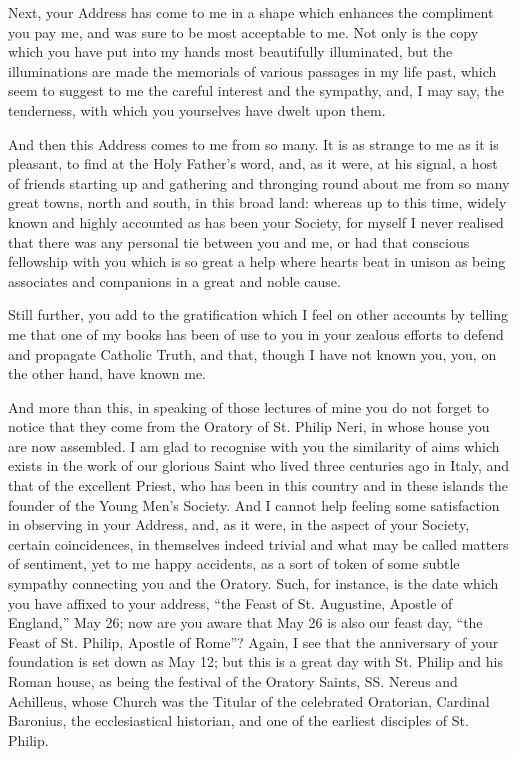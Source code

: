 Next, your Address has come to me in a shape which enhances the
compliment you pay me, and was sure to be most acceptable to me. Not
only is the copy which you have put into my hands most beautifully
illuminated, but the illuminations are made the memorials of various
passages in my life past, which seem to suggest to me the careful
interest and the sympathy, and, I may say, the tenderness, with which
you yourselves have dwelt upon them.

And then this Address comes to me from so many. It is as strange to
me as it is pleasant, to find at the Holy Father's word, and, as it
were, at his signal, a host of friends starting up and gathering and
thronging round about me from so many great towns, north and south, in
this broad land: whereas up to this time, widely known and
highly accounted as has been your Society, for myself I never realised
that there was any personal tie between you and me, or had that
conscious fellowship with you which is so great a help where hearts
beat in unison as being associates and companions in a great and noble
cause.

Still further, you add to the gratification which I feel on other
accounts by telling me that one of my books has been of use to you in
your zealous efforts to defend and propagate Catholic Truth, and that,
though I have not known you, you, on the other hand, have known me.

And more than this, in speaking of those lectures of mine you do
not forget to notice that they come from the Oratory of St. Philip
Neri, in whose house you are now assembled. I am glad to recognise
with you the similarity of aims which exists in the work of our
glorious Saint who lived three centuries ago in Italy, and that of the
excellent Priest, who has been in this country and in these islands
the founder of the Young Men's Society. And I cannot help feeling some
satisfaction in observing in your Address, and, as it were, in the
aspect of your Society, certain coincidences, in themselves
indeed trivial and what may be called matters of sentiment, yet to me
happy accidents, as a sort of token of some subtle sympathy connecting
you and the Oratory. Such, for instance, is the date which you have
affixed to your address, ``the Feast of St. Augustine, Apostle of
England,'' May 26; now are you aware that May 26 is also our feast
day, ``the Feast of St. Philip, Apostle of Rome''? Again, I
see that the anniversary of your foundation is set down as May 12; but
this is a great day with St. Philip and his Roman house, as being the
festival of the Oratory Saints, SS. Nereus and Achilleus, whose Church
was the Titular of the celebrated Oratorian, Cardinal Baronius, the
ecclesiastical historian, and one of the earliest disciples of St.
Philip.

